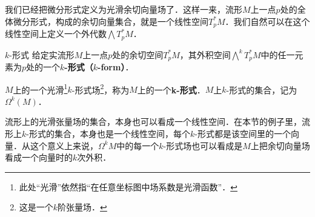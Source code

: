 我们已经把微分形式定义为光滑余切向量场了．这样一来，流形$M$上一点$p$处的全体微分形式，构成的余切向量集合，就是一个线性空间$T^*_pM$．我们自然可以在这个线性空间上定义一个外代数$\bigwedge T^*_pM$．

\begin{definition}{$k$-形式}
给定实流形$M$上一点$p$处的余切空间$T^*_pM$，其外积空间$\bigwedge^kT^*_pM$中的任一元素为$p$处的一个\textbf{$k$-形式（$k$-form）}．

$M$上的一个光滑\footnote{此处“光滑”依然指“在任意坐标图中场系数是光滑函数”．}$k$-形式场\footnote{这是一个$k$阶张量场．}，称为$M$上的一个\textbf{k-形式}．$M$上$k$-形式的集合，记为$\Omega^k(M)$．
\end{definition}

流形上的光滑张量场的集合，本身也可以看成一个线性空间．在本节的例子里，流形上$k$-形式的集合，本身也是一个线性空间，每个$k$-形式都是该空间里的一个向量．从这个意义上来说，$\Omega^k{M}$中的每一个$k$-形式场也可以看成是$M$上把余切向量场看成一个向量时的$k$次外积．








